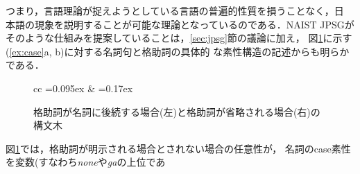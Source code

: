 つまり，言語理論が捉えようとしている言語の普遍的性質を損うことなく，日
本語の現象を説明することが可能な理論となっているのである．NAIST JPSGが
そのような仕組みを提案していることは，\ref{sec:jpsg}節の議論に加え，
図\ref{fig:drop}に示す(\ref{ex:case}a, b)に対する名詞句と格助詞の具体的
な素性構造の記述からも明らかである．
\begin{figure}
\begin{center}\small
\begin{tabular}{cc}
\unitlength=0.095ex
\hspace*{3.0cm} &
\unitlength=0.17ex
\hspace*{3.0cm}
\end{tabular}
\end{center}
\caption{格助詞が名詞に後続する場合(左)と格助詞が省略される場合(右)の構文木}
\label{fig:drop}
\end{figure}
図\ref{fig:drop}では，格助詞が明示される場合とされない場合の任意性が，
名詞の{\sc case}素性を変数(すなわち{\it none\/}や{\it ga\/}の上位であ

